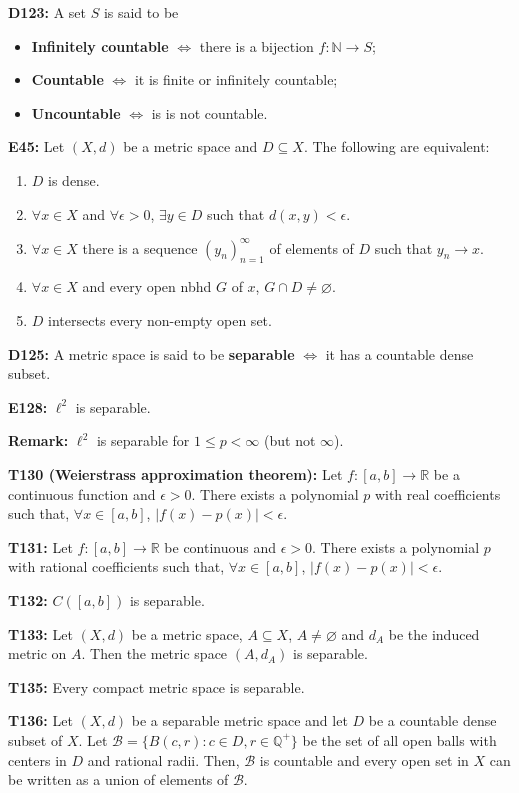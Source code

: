 \documentclass[twocolumn,10pt]{article}
\begin{document}
\textbf{D123:} A set $S$ is said to be
\begin{itemize}
    \item \textbf{Infinitely countable} $\Leftrightarrow$ there is a bijection $f:\mathbb{N}\to S$;
    \item \textbf{Countable} $\Leftrightarrow$ it is finite or infinitely countable;
    \item \textbf{Uncountable} $\Leftrightarrow$ is is not countable.
\end{itemize}
\textbf{E45:} Let $(X,d)$ be a metric space and $D\subseteq X$. The following are equivalent:
\begin{enumerate}
    \item $D$ is dense.
    \item $\forall x\in X$ and $\forall\epsilon>0$, $\exists y\in D$ such that $d(x,y)<\epsilon$.
    \item $\forall x\in X$ there is a sequence $(y_n)_{n=1}^{\infty}$ of elements of $D$ such that $y_n\to x$.
    \item $\forall x\in X$ and every open nbhd $G$ of $x$, $G\cap D\neq\varnothing$.
    \item $D$ intersects every non-empty open set.
\end{enumerate}
\textbf{D125:} A metric space is said to be \textbf{separable} $\Leftrightarrow$ it has a countable dense subset.


\textbf{E128:} $\ell^2$ is separable.


\textbf{Remark:} $\ell^2$ is separable for $1\leq p<\infty$ (but not $\infty$).


\textbf{T130 (Weierstrass approximation theorem):} Let $f:[a,b]\to\mathbb{R}$ be a continuous function and $\epsilon>0$. There exists a polynomial $p$ with real coefficients such that, $\forall x\in[a,b]$, $|f(x)-p(x)|<\epsilon$.

\textbf{T131:} Let $f:[a,b]\to\mathbb{R}$ be continuous and $\epsilon>0$. There exists a polynomial $p$ with rational coefficients such that, $\forall x\in[a,b]$, $|f(x)-p(x)|<\epsilon$.


\textbf{T132:} $C([a,b])$ is separable.


\textbf{T133:} Let $(X,d)$ be a metric space, $A\subseteq X$, $A\neq\varnothing$ and $d_A$ be the induced metric on $A$. Then the metric space $(A,d_A)$ is separable.


\textbf{T135:} Every compact metric space is separable.


\textbf{T136:} Let $(X,d)$ be a separable metric space and let $D$ be a countable dense subset of $X$. Let $\mathcal{B}=\{B(c,r):c\in D,r\in\mathbb{Q}^+\}$ be the set of all open balls with centers in $D$ and rational radii. Then, $\mathcal{B}$ is countable and every open set in $X$ can be written as a union of elements of $\mathcal{B}$.
\end{document}
